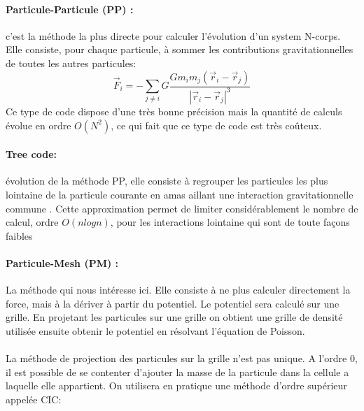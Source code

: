 \paragraph{Particule-Particule (PP) : } c'est la méthode la plus directe pour calculer l'évolution d'un system N-corps. 
Elle consiste, pour chaque particule, à sommer les contributions gravitationnelles de toutes les autres particules:
\begin{equation}
\vec{F}_i=-\sum_{j\neq i} G \frac{G m_i m_j(\vec{r}_i - \vec{r}_j) }{ |\vec{r}_i - \vec{r}_j |^3}
\end{equation}
Ce type de code dispose d'une très bonne précision mais la quantité de calculs évolue en ordre $O(N^2)$, ce qui fait que ce type de code est très coûteux.

\paragraph{Tree code: } évolution de la méthode PP, elle consiste à regrouper les particules les plus lointaine de la particule courante en amas aillant une interaction gravitationnelle commune \citep{1986Natur.324..446B}.
Cette approximation permet de limiter considérablement le nombre de calcul, ordre $O(n log n)$, pour les interactions lointaine qui sont de toute façons faibles 



%


\paragraph{Particule-Mesh (PM) : } La méthode qui nous intéresse ici.
Elle consiste à ne plus calculer directement la force, mais à la dériver à partir du potentiel.
Le potentiel sera calculé sur une grille.
En projetant les particules sur une grille on obtient une grille de densité utilisée ensuite obtenir le potentiel en résolvant l'équation de Poisson.

\paragraph{}
La méthode de projection des particules sur la grille n'est pas unique.
A l'ordre $0$, il est possible de se contenter d'ajouter la masse de la particule dans la cellule a laquelle elle appartient.
On utilisera en pratique une méthode d'ordre supérieur appelée \ac{CIC}:

